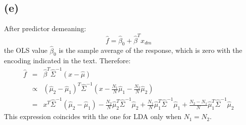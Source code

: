 \subsection*{(e)}

After predictor demeaning:
\begin{equation*}
\hat{f} = \hat{\beta}_0 + \hat{\beta}^T x_{dm}
\end{equation*}
the OLS value $\hat{\beta}_0$ is the sample average of the response, which
is zero with the encoding indicated in the text. Therefore:
\begin{eqnarray*}
\hat{f} & = & \hat{\beta}^T \hat{\Sigma}^{-1}\left(x - \hat{\mu}\right) \\
   & \propto & \left(\hat{\mu}_2 - \hat{\mu}_1\right)^T \hat{\Sigma}^{-1}\left(x - \frac{N_1}{N} \hat{\mu}_1 - \frac{N_2}{N} \hat{\mu}_2\right) \\
   & = & x^T \hat{\Sigma}^{-1} \left(\hat{\mu}_2 - \hat{\mu}_1 \right) - 
     \frac{N_2}{N} \hat{\mu}_2^T \hat{\Sigma}^{-1} \hat{\mu}_2 +
     \frac{N_1}{N} \hat{\mu}_1^T \hat{\Sigma}^{-1} \hat{\mu}_1 + 
     \frac{N_2 - N_1}{N} \hat{\mu}_1 ^T \hat{\Sigma}^{-1} \hat{\mu}_2
\end{eqnarray*}
This expression coincides with the one for LDA only when $N_1 = N_2$.
